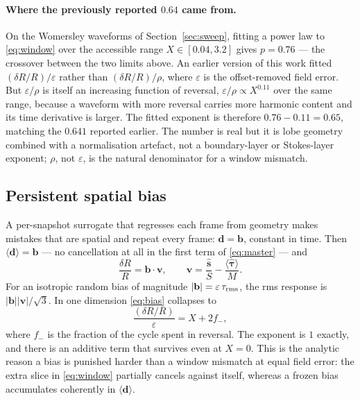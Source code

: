 \documentclass[11pt,a4paper]{article}
\newcommand{\eps}{\varepsilon}
\begin{document}
\paragraph{Where the previously reported $0.64$ came from.}
On the Womersley waveforms of Section~\ref{sec:sweep}, fitting a power law to
\eqref{eq:window} over the accessible range $X\in[0.04,3.2]$ gives $p=0.76$
--- the crossover between the two limits above. An earlier version of this
work fitted $(\delta R/R)/\eps$ rather than $(\delta R/R)/\rho$, where $\eps$
is the offset-removed field error. But $\eps/\rho$ is itself an increasing
function of reversal, $\eps/\rho\propto X^{0.11}$ over the same range,
because a waveform with more reversal carries more harmonic content and its
time derivative is larger. The fitted exponent is therefore
$0.76-0.11=0.65$, matching the $0.641$ reported earlier. The number is real
but it is lobe geometry combined with a normalisation artefact, not a
boundary-layer or Stokes-layer exponent; $\rho$, not $\eps$, is the natural
denominator for a window mismatch.

\subsection{Persistent spatial bias}
\label{sec:bias}

A per-snapshot surrogate that regresses each frame from geometry makes
mistakes that are spatial and repeat every frame: $\mathbf d=\mathbf b$,
constant in time. Then $\langle\mathbf d\rangle=\mathbf b$ --- no
cancellation at all in the first term of \eqref{eq:master} --- and
\begin{equation}
\frac{\delta R}{R}=\mathbf b\cdot\mathbf v,
\qquad
\mathbf v=\frac{\hat{\mathbf s}}{S}-\frac{\langle\hat{\boldsymbol\tau}\rangle}{M}.
\label{eq:bias}
\end{equation}
For an isotropic random bias of magnitude $|\mathbf b|=\eps\,
\tau_{\rm rms}$, the rms response is $|\mathbf b||\mathbf v|/\sqrt3$. In one
dimension \eqref{eq:bias} collapses to
\begin{equation}
\frac{(\delta R/R)}{\eps}=X+2f_-,
\label{eq:bias1d}
\end{equation}
where $f_-$ is the fraction of the cycle spent in reversal. The exponent is
$1$ exactly, and there is an additive term that survives even at $X=0$. This
is the analytic reason a bias is punished harder than a window mismatch at
equal field error: the extra slice in \eqref{eq:window} partially cancels
against itself, whereas a frozen bias accumulates coherently in
$\langle\mathbf d\rangle$.
\end{document}
